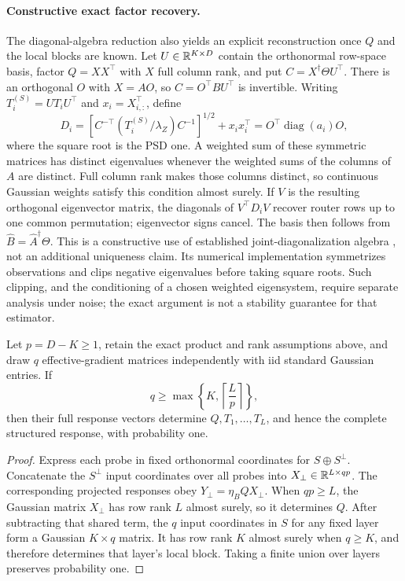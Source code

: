 \paragraph{Constructive exact factor recovery.}
The diagonal-algebra reduction also yields an explicit reconstruction once
$Q$ and the local blocks are known. Let $U\in\mathbb{R}^{K\times D}$ contain the
orthonormal row-space basis, factor $Q=XX^\top$ with $X$ full column rank,
and put $C=X^\dagger\Theta U^\top$. There is an orthogonal $O$ with
$X=AO$, so $C=O^\top BU^\top$ is invertible. Writing
$T_i^{(S)}=UT_iU^\top$ and $x_i=X_{i,:}^\top$, define
\[
 D_i=\left[C^{-\top}(T_i^{(S)}/\lambda_Z)C^{-1}\right]^{1/2}
       +x_ix_i^\top
     =O^\top\operatorname{diag}(a_i)O,
\]
where the square root is the PSD one. A weighted sum of these symmetric
matrices has distinct eigenvalues whenever the weighted sums of the columns
of $A$ are distinct. Full column rank makes those columns distinct, so
continuous Gaussian weights satisfy this condition almost surely. If $V$
is the resulting orthogonal eigenvector matrix, the diagonals of $V^\top D_iV$
recover router rows up to one common permutation; eigenvector signs cancel.
The basis then follows from $\widehat B=\widehat A^\dagger\Theta$.
This is a constructive use of established joint-diagonalization algebra
\citep{afsari2008sensitivity,bhaskara2014uniqueness}, not an additional
uniqueness claim. Its numerical implementation symmetrizes observations and
clips negative eigenvalues before taking square roots. Such clipping, and
the conditioning of a chosen weighted eigensystem, require separate analysis
under noise; the exact argument is not a stability guarantee for that estimator.

\begin{proposition}
\label{prop:response_tomography_gaussian}
Let $p=D-K\ge1$, retain the exact product and rank assumptions above, and
draw $q$ effective-gradient matrices independently with iid standard
Gaussian entries.  If
\begin{equation}
 q\ge\max\left\{K,\left\lceil\frac{L}{p}\right\rceil\right\},
 \label{eq:app_tomo_gaussian_count}
\end{equation}
then their full response vectors determine $Q,T_1,\ldots,T_L$, and hence
the complete structured response, with probability one.
\end{proposition}

\begin{proof}
Express each probe in fixed orthonormal coordinates for $S\oplus S^\perp$.
Concatenate the $S^\perp$ input coordinates over all probes into
$X_\perp\in\mathbb{R}^{L\times qp}$.  The corresponding projected responses obey
$Y_\perp=\eta_BQX_\perp$.  When $qp\ge L$, the Gaussian matrix
$X_\perp$ has row rank $L$ almost surely, so it determines $Q$.  After
subtracting that shared term, the $q$ input coordinates in $S$ for any
fixed layer form a Gaussian $K\times q$ matrix.  It has row rank $K$
almost surely when $q\ge K$, and therefore determines that layer's local
block.  Taking a finite union over layers preserves probability one.
\end{proof}

